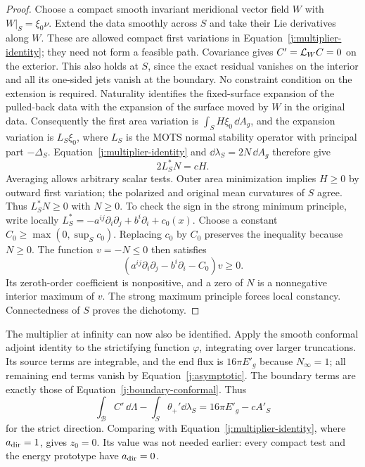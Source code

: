 \begin{proof}
Choose a compact smooth invariant meridional vector field \(W\) with
\(W|_S=\xi_0\nu\). Extend the data smoothly across \(S\) and take their
Lie derivatives along \(W\). These are allowed compact first variations
in Equation~\eqref{j:multiplier-identity}; they need not form a feasible
path. Covariance gives \(C'=\mathcal L_WC=0\) on the exterior. This also
holds at \(S\), since the exact residual vanishes on the interior and
all its one-sided jets vanish at the boundary. No constraint condition
on the extension is required. Naturality identifies the fixed-surface
expansion of the pulled-back data with the expansion of the surface
moved by \(W\) in the original data. Consequently the first area
variation is \(\int_S H\xi_0\,\dd A_g\), and the expansion variation is
\(L_S\xi_0\), where \(L_S\) is the MOTS normal stability operator with
principal part \(-\Delta_S\). Equation~\eqref{j:multiplier-identity} and
\(\dd\lambda_S=2N\,\dd A_g\) therefore give
\begin{equation}
\label{j:stability-boundary}
 2L_S^*N=cH.
\end{equation}
Averaging allows arbitrary scalar tests. Outer area minimization implies
\(H\geq0\) by outward first variation; the polarized and original mean
curvatures of \(S\) agree. Thus \(L_S^*N\geq0\) with \(N\geq0\).
To check the sign in the strong minimum principle, write locally
\(L_S^*=-a^{ij}\partial_i\partial_j+b^i\partial_i+c_0(x)\).
Choose a constant \(C_0\geq\max(0,\sup_Sc_0)\). Replacing \(c_0\)
by \(C_0\) preserves the inequality because \(N\geq0\). The function
\(v=-N\leq0\) then satisfies
\[
 (a^{ij}\partial_i\partial_j-b^i\partial_i-C_0)v\geq0.
\]
Its zeroth-order coefficient is nonpositive, and a zero of \(N\) is a
nonnegative interior maximum of \(v\). The strong maximum principle
forces local constancy. Connectedness of \(S\) proves the dichotomy.
\end{proof}

The multiplier at infinity can now also be identified. Apply the smooth
conformal adjoint identity to the strictifying function \(\varphi\),
integrating over larger truncations. Its source terms are integrable,
and the end flux is \(16\pi E'_g\) because \(N_\infty=1\); all
remaining end terms vanish by Equation~\eqref{j:asymptotic}. The boundary
terms are exactly those of Equation~\eqref{j:boundary-conformal}.
Thus
\[
 \int_{\mathcal B}C'\,\dd\Lambda
      -\int_S\theta_+'\dd\lambda_S
       =16\pi E'_g-cA'_S
\]
for the strict direction. Comparing with
Equation~\eqref{j:multiplier-identity}, where \(a_{\rm dir}=1\), gives
\(z_0=0\). Its value was not needed earlier: every compact test and
the energy prototype have \(a_{\rm dir}=0\).


